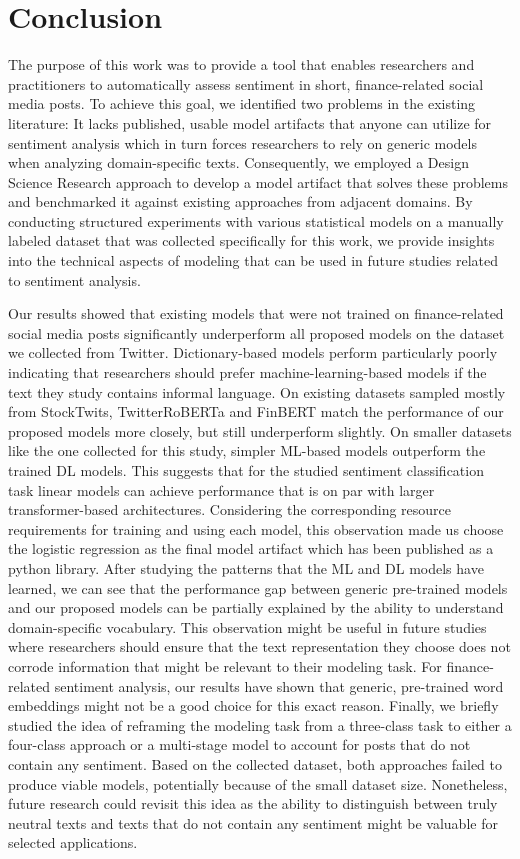 \section{Conclusion}
The purpose of this work was to provide a tool that enables researchers and practitioners to automatically assess sentiment in short, finance-related social media posts. To achieve this goal, we identified two problems in the existing literature: It lacks published, usable model artifacts that anyone can utilize for sentiment analysis which in turn forces researchers to rely on generic models when analyzing domain-specific texts. Consequently, we employed a Design Science Research approach to develop a model artifact that solves these problems and benchmarked it against existing approaches from adjacent domains. By conducting structured experiments with various statistical models on a manually labeled dataset that was collected specifically for this work, we provide insights into the technical aspects of modeling that can be used in future studies related to sentiment analysis.

Our results showed that existing models that were not trained on finance-related social media posts significantly underperform all proposed models on the dataset we collected from Twitter. Dictionary-based models perform particularly poorly indicating that researchers should prefer machine-learning-based models if the text they study contains informal language. On existing datasets sampled mostly from StockTwits, TwitterRoBERTa and FinBERT match the performance of our proposed models more closely, but still underperform slightly. On smaller datasets like the one collected for this study, simpler ML-based models outperform the trained DL models. This suggests that for the studied sentiment classification task linear models can achieve performance that is on par with larger transformer-based architectures. Considering the corresponding resource requirements for training and using each model, this observation made us choose the logistic regression as the final model artifact which has been published as a python library.
After studying the patterns that the ML and DL models have learned, we can see that the performance gap between generic pre-trained models and our proposed models can be partially explained by the ability to understand domain-specific vocabulary. This observation might be useful in future studies where researchers should ensure that the text representation they choose does not corrode information that might be relevant to their modeling task. For finance-related sentiment analysis, our results have shown that generic, pre-trained word embeddings might not be a good choice for this exact reason.
Finally, we briefly studied the idea of reframing the modeling task from a three-class task to either a four-class approach or a multi-stage model to account for posts that do not contain any sentiment. Based on the collected dataset, both approaches failed to produce viable models, potentially because of the small dataset size. Nonetheless, future research could revisit this idea as the ability to distinguish between truly neutral texts and texts that do not contain any sentiment might be valuable for selected applications.

